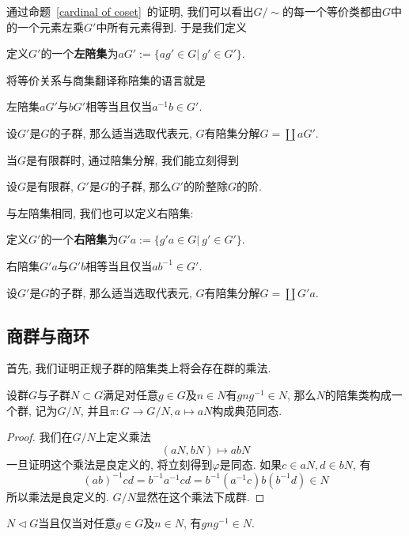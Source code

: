 通过命题~\ref{cardinal of coset}~的证明, 我们可以看出$G/\sim$的每一个等价类都由$G$中的一个元素左乘$G'$中所有元素得到.
于是我们定义
\begin{defn}
    定义$G'$的一个\textbf{左陪集}为$aG':=\{ag'\in G|\ g'\in G'\}$.
\end{defn}

将等价关系与商集翻译称陪集的语言就是
\begin{prop}
    左陪集$aG'$与$bG'$相等当且仅当$a^{-1}b\in G'$.
\end{prop}
\begin{prop}
    设$G'$是$G$的子群, 那么适当选取代表元, $G$有陪集分解$G=\coprod aG'$.
\end{prop}

当$G$是有限群时, 通过陪集分解, 我们能立刻得到
\begin{thm}[Lagrange]
    设$G$是有限群, $G'$是$G$的子群, 那么$G'$的阶整除$G$的阶.
\end{thm}

与左陪集相同, 我们也可以定义右陪集:
\begin{defn}
    定义$G'$的一个\textbf{右陪集}为$G'a:=\{g'a\in G|\ g'\in G'\}$.
\end{defn}
\begin{prop}
    右陪集$G'a$与$G'b$相等当且仅当$ab^{-1}\in G'$.
\end{prop}
\begin{prop}
    设$G'$是$G$的子群, 那么适当选取代表元, $G$有陪集分解$G=\coprod G'a$.
\end{prop}

\subsection{商群与商环}

首先, 我们证明正规子群的陪集类上将会存在群的乘法.
\begin{thm}
    设群$G$与子群$N\subset G$满足对任意$g\in G$及$n\in N$有$gng^{-1}\in N$, 那么$N$的陪集类构成一个群, 记为$G/N$, 并且$\pi:G\to G/N, a\mapsto aN$构成典范同态.
\end{thm}
\begin{proof}
    我们在$G/N$上定义乘法
    \[(aN,bN)\mapsto abN\]
    一旦证明这个乘法是良定义的, 将立刻得到$\varphi$是同态.
    如果$c\in aN,d\in bN$, 有
    \[(ab)^{-1}cd=b^{-1}a^{-1}cd=b^{-1}(a^{-1}c)b(b^{-1}d)\in N\]
    所以乘法是良定义的. $G/N$显然在这个乘法下成群.
\end{proof}

\begin{col}
    $N\lhd G$当且仅当对任意$g\in G$及$n\in N$, 有$gng^{-1}\in N$.
\end{col}

